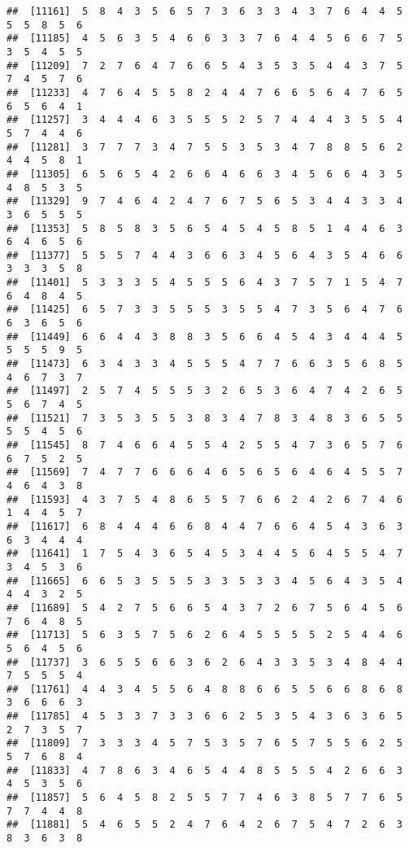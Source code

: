 \documentclass[
]{book}
\begin{document}
\begin{verbatim}
##  [11161]  5  8  4  3  5  6  5  7  3  6  3  3  4  3  7  6  4  4  5  5  5  8  5  6
##  [11185]  4  5  6  3  5  4  6  6  3  3  7  6  4  4  5  6  6  7  5  3  5  4  5  5
##  [11209]  7  2  7  6  4  7  6  6  5  4  3  5  3  5  4  4  3  7  5  7  4  5  7  6
##  [11233]  4  7  6  4  5  5  8  2  4  4  7  6  6  5  6  4  7  6  5  6  5  6  4  1
##  [11257]  3  4  4  4  6  3  5  5  5  2  5  7  4  4  4  3  5  5  4  5  7  4  4  6
##  [11281]  3  7  7  7  3  4  7  5  5  3  5  3  4  7  8  8  5  6  2  4  4  5  8  1
##  [11305]  6  5  6  5  4  2  6  6  4  6  6  3  4  5  6  6  4  3  5  4  8  5  3  5
##  [11329]  9  7  4  6  4  2  4  7  6  7  5  6  5  3  4  4  3  3  4  3  6  5  5  5
##  [11353]  5  8  5  8  3  5  6  5  4  5  4  5  8  5  1  4  4  6  3  6  4  6  5  6
##  [11377]  5  5  5  7  4  4  3  6  6  3  4  5  6  4  3  5  4  6  6  3  3  3  5  8
##  [11401]  5  3  3  3  5  4  5  5  5  6  4  3  7  5  7  1  5  4  7  6  4  8  4  5
##  [11425]  6  5  7  3  3  5  5  5  3  5  5  4  7  3  5  6  4  7  6  6  3  6  5  6
##  [11449]  6  6  4  4  3  8  8  3  5  6  6  4  5  4  3  4  4  4  5  5  5  5  9  5
##  [11473]  6  3  4  3  3  4  5  5  5  4  7  7  6  6  3  5  6  8  5  4  6  7  3  7
##  [11497]  2  5  7  4  5  5  5  3  2  6  5  3  6  4  7  4  2  6  5  5  6  7  4  5
##  [11521]  7  3  5  3  5  5  3  8  3  4  7  8  3  4  8  3  6  5  5  5  5  4  5  6
##  [11545]  8  7  4  6  6  4  5  5  4  2  5  5  4  7  3  6  5  7  6  6  7  5  2  5
##  [11569]  7  4  7  7  6  6  6  4  6  5  6  5  6  4  6  4  5  5  7  4  6  4  3  8
##  [11593]  4  3  7  5  4  8  6  5  5  7  6  6  2  4  2  6  7  4  6  1  4  4  5  7
##  [11617]  6  8  4  4  4  6  6  8  4  4  7  6  6  4  5  4  3  6  3  6  3  4  4  4
##  [11641]  1  7  5  4  3  6  5  4  5  3  4  4  5  6  4  5  5  4  7  3  4  5  3  6
##  [11665]  6  6  5  3  5  5  5  3  3  5  3  3  4  5  6  4  3  5  4  4  4  3  2  5
##  [11689]  5  4  2  7  5  6  6  5  4  3  7  2  6  7  5  6  4  5  6  7  6  4  8  5
##  [11713]  5  6  3  5  7  5  6  2  6  4  5  5  5  5  2  5  4  4  6  5  6  4  5  6
##  [11737]  3  6  5  5  6  6  3  6  2  6  4  3  3  5  3  4  8  4  4  7  5  5  5  4
##  [11761]  4  4  3  4  5  5  6  4  8  8  6  6  5  5  6  6  8  6  8  3  6  6  6  3
##  [11785]  4  5  3  3  7  3  3  6  6  2  5  3  5  4  3  6  3  6  5  2  7  3  5  7
##  [11809]  7  3  3  3  4  5  7  5  3  5  7  6  5  7  5  5  6  2  5  5  7  6  8  4
##  [11833]  4  7  8  6  3  4  6  5  4  4  8  5  5  5  4  2  6  6  3  4  5  3  5  6
##  [11857]  5  6  4  5  8  2  5  5  7  7  4  6  3  8  5  7  7  6  5  7  7  4  4  8
##  [11881]  5  4  6  5  5  2  4  7  6  4  2  6  7  5  4  7  2  6  3  8  3  6  3  8

\end{verbatim}
\end{document}
